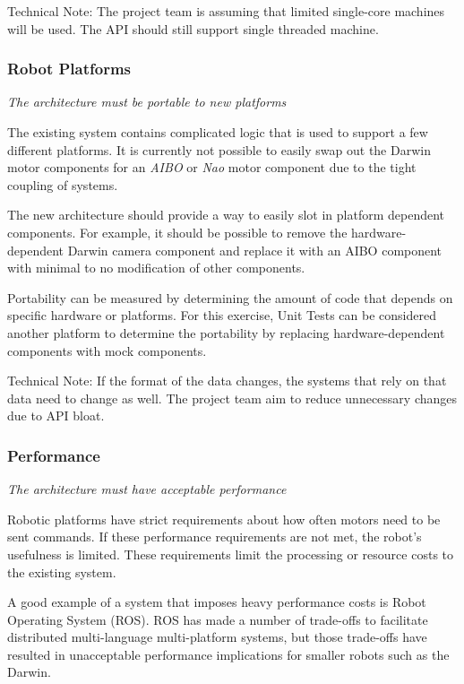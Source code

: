 \documentclass[english,12pt]{scrartcl}
\newcommand{\requirement}[1]{\textit{#1}}
\begin{document}
				Technical Note: The project team is assuming that limited single-core machines will be used.
				The API should still support single threaded machine.

			\subsubsection{Robot Platforms}
				\requirement{The architecture must be portable to new platforms}

				The existing system contains complicated logic that is used to support a few different platforms.
				It is currently not possible to easily swap out the Darwin motor components for an \emph{AIBO} or \emph{Nao} motor component due to the tight coupling of systems.

				The new architecture should provide a way to easily slot in platform dependent components.
				For example, it should be possible to remove the hardware-dependent Darwin camera component and replace it with an AIBO component with minimal to no modification of other components.

				Portability can be measured by determining the amount of code that depends on specific hardware or platforms.
				For this exercise, Unit Tests can be considered another platform to determine the portability by replacing hardware-dependent components with mock components.

				Technical Note: If the format of the data changes, the systems that rely on that data need to change as well.
				The project team aim to reduce unnecessary changes due to API bloat.

			\subsubsection{Performance}
				\requirement{The architecture must have acceptable performance}

				Robotic platforms have strict requirements about how often motors need to be sent commands.
				If these performance requirements are not met, the robot’s usefulness is limited.
				These requirements limit the processing or resource costs to the existing system.

				A good example of a system that imposes heavy performance costs is Robot Operating System (ROS).
				ROS has made a number of trade-offs to facilitate distributed multi-language multi-platform systems, but those trade-offs have resulted in unacceptable performance implications for smaller robots such as the Darwin.
\end{document}
